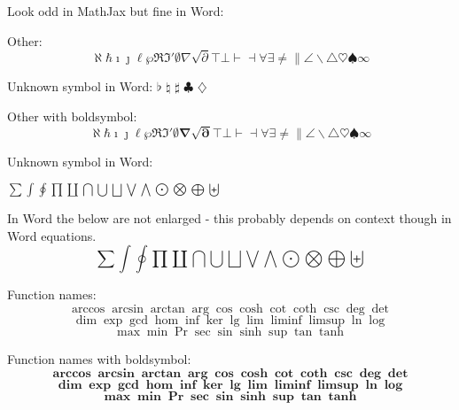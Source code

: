 \documentclass[12pt,a4paper]{article}
\theoremstyle{clearprint}
\begin{document}
Look odd in MathJax but fine in Word: \boldsymbol{$\Uparrow$ $\Downarrow$ $\Updownarrow$}

\noindent 
Other:
\begin{equation}
\aleph \hbar \imath \jmath \ell \wp \Re \Im \prime \emptyset \nabla \surd \partial \top \bot \vdash \dashv \forall \exists \neq  \| \angle \backslash \triangle  \heartsuit \spadesuit \infty
\end{equation}

Unknown symbol in Word: $\flat$ $\natural$ $\sharp$ $\clubsuit$ $\diamondsuit$

\noindent 
Other with boldsymbol:
\begin{equation}
\boldsymbol{\aleph \hbar \imath \jmath \ell \wp \Re \Im \prime \emptyset \nabla \surd \partial \top \bot \vdash \dashv \forall \exists \neq  \| \angle \backslash \triangle  \heartsuit \spadesuit \infty}
\end{equation}

Unknown symbol in Word: \boldsymbol{$\flat$ $\natural$ $\sharp$ $\clubsuit$ $\diamondsuit$}

\noindent 
\begin{center}
$\sum \int \oint \prod \coprod \bigcap \bigcup \bigsqcup \bigvee \bigwedge \bigodot \bigotimes \bigoplus \biguplus$
\end{center}

In Word the below are not enlarged - this probably depends on context though in Word equations.
\begin{equation}
\sum \int \oint \prod \coprod \bigcap \bigcup \bigsqcup \bigvee \bigwedge \bigodot \bigotimes \bigoplus \biguplus
\end{equation}

\noindent 
Function names:
\begin{equation}
\arccos \arcsin \arctan \arg \cos \cosh \cot \coth \csc \deg \det 
\end{equation}
\begin{equation}
\dim \exp \gcd \hom \inf \ker \lg \lim \liminf \limsup \ln \log 
\end{equation}
\begin{equation}
\max \min \Pr \sec \sin \sinh \sup \tan \tanh
\end{equation}

\noindent 
Function names with boldsymbol:
\begin{equation}
\boldsymbol{\arccos \arcsin \arctan \arg \cos \cosh \cot \coth \csc \deg \det} 
\end{equation}
\begin{equation}
\boldsymbol{\dim \exp \gcd \hom \inf \ker \lg \lim \liminf \limsup \ln \log} 
\end{equation}
\begin{equation}
\boldsymbol{\max \min \Pr \sec \sin \sinh \sup \tan \tanh}
\end{equation}
\end{document}

